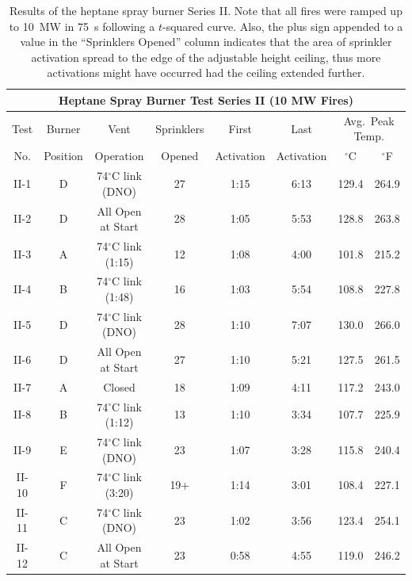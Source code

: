 \begin{table}[ht!]
\begin{center}
\begin{tabular}{|c||c|c|c|c|c|c|c|}
\hline
\multicolumn{8}{|c|}{\bf Heptane Spray Burner Test Series II (10 MW Fires)}\\ \hline \hline
Test & Burner   & Vent      & Sprinklers & First      & Last      & \multicolumn{2}{|c|}{Avg.~Peak Temp.} \\ \cline{7-8}
No.  & Position & Operation & Opened     & Activation & Activation & $^\circ$C & $^\circ$F   \\
\hline \hline
II-1  & D  & 74$^\circ$C link (DNO)  & 27 & 1:15 & 6:13 & 129.4 &264.9 \\ \hline
II-2  & D  & All Open at Start       & 28 & 1:05 & 5:53 & 128.8 &263.8 \\ \hline
II-3  & A  & 74$^\circ$C link (1:15) & 12 & 1:08 & 4:00 & 101.8 &215.2 \\ \hline
II-4  & B  & 74$^\circ$C link (1:48) & 16 & 1:03 & 5:54 & 108.8 &227.8 \\ \hline
II-5  & D  & 74$^\circ$C link (DNO)  & 28 & 1:10 & 7:07 & 130.0 &266.0 \\ \hline
II-6  & D  & All Open at Start       & 27 & 1:10 & 5:21 & 127.5 &261.5 \\ \hline
II-7  & A  & Closed                  & 18 & 1:09 & 4:11 & 117.2 &243.0 \\ \hline
II-8  & B  & 74$^\circ$C link (1:12) & 13 & 1:10 & 3:34 & 107.7 &225.9 \\ \hline
II-9  & E  & 74$^\circ$C link (DNO)  & 23 & 1:07 & 3:28 & 115.8 &240.4 \\ \hline
II-10 & F  & 74$^\circ$C link (3:20) & 19+& 1:14 & 3:01 & 108.4 &227.1 \\ \hline
II-11 & C  & 74$^\circ$C link (DNO)  & 23 & 1:02 & 3:56 & 123.4 &254.1 \\ \hline
II-12 & C  & All Open at Start       & 23 & 0:58 & 4:55 & 119.0 &246.2 \\ \hline
\end{tabular}
\end{center}
\caption[Results of the UL/NFPRF Experiments, Series~II]
{Results of the heptane spray burner Series II. Note that all fires
were ramped up to 10~MW in 75~s following a $t$-squared curve. Also, the
plus sign appended to a value in the ``Sprinklers Opened''
column indicates that the area of sprinkler activation spread to the
edge of the adjustable height ceiling, thus more activations might have
occurred had the ceiling extended further.}
\label{ULburnermatrixII}
\end{table}


